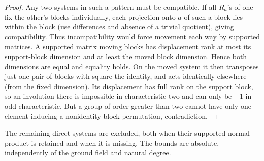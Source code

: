 \begin{proof}
Any two systems in such a pattern must be compatible. If all \(R_a\)'s of one fix the other's blocks individually, each projection onto \(a\) of such a block lies within the block (use differences and absence of a trivial quotient), giving compatibility. Thus incompatibility would force movement each way by supported matrices. A supported matrix moving blocks has displacement rank at most its support-block dimension and at least the moved block dimension. Hence both dimensions are equal and equality holds. On the moved system it then transposes just one pair of blocks with square the identity, and acts identically elsewhere (from the fixed dimension). Its displacement has full rank on the support block, so an involution there is impossible in characteristic two and can only be \(-1\) in odd characteristic. But a group of order greater than two cannot have only one element inducing a nonidentity block permutation, contradiction.
\end{proof}

\begin{proposition}\label{c:direct-pruning}
The remaining direct systems are excluded, both when their supported normal product is retained and when it is missing. The bounds are absolute, independently of the ground field and natural degree.
\end{proposition}

